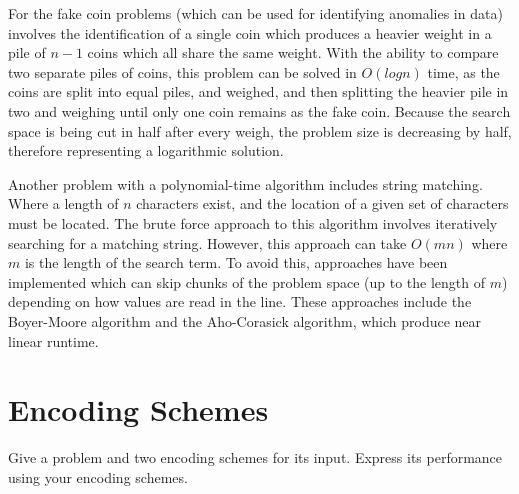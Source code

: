 \documentclass{article}
\renewcommand{\_}{\ifincsname_\else\legacyunderscore\fi}
\begin{document}
For the fake coin problems (which can be used for identifying anomalies in data) involves the identification of a single coin which produces a heavier weight in a pile of $n-1$ coins which all share the same weight. With the ability to compare two separate piles of coins, this problem can be solved in $O(log n)$ time, as the coins are split into equal piles, and weighed, and then splitting the heavier pile in two and weighing until only one coin remains as the fake coin. Because the search space is being cut in half after every weigh, the problem size is decreasing by half, therefore representing a logarithmic solution.

Another problem with a polynomial-time algorithm includes string matching. Where a length of $n$ characters exist, and the location of a given set of characters must be located. The brute force approach to this algorithm involves iteratively searching for a matching string. However, this approach can take $O(mn)$ where $m$ is the length of the search term. To avoid this, approaches have been implemented which can skip chunks of the problem space (up to the length of $m$) depending on how values are read in the line. These approaches include the Boyer-Moore algorithm and the Aho-Corasick algorithm, which produce near linear runtime.

\section{Encoding Schemes}

    Give a problem and two encoding schemes for its input.  Express its performance using your encoding schemes.
\end{document}
